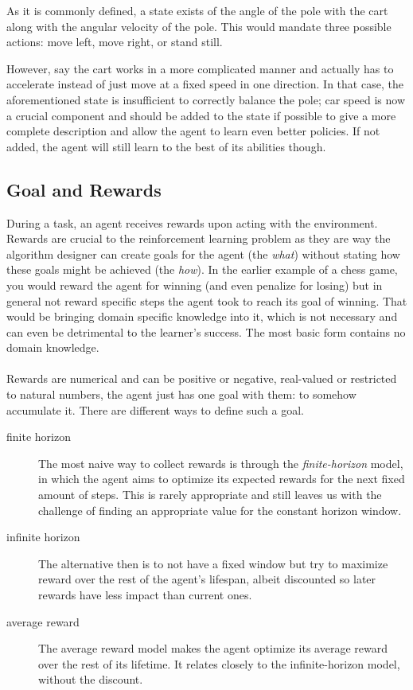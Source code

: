 As it is commonly defined,
a state exists of the angle of the pole with the cart
along with the angular velocity of the pole.
This would mandate three possible actions:
move left, move right, or stand still.

However, say the cart works in a more complicated manner
and actually has to accelerate instead of just
move at a fixed speed in one direction.
In that case,
the aforementioned state is insufficient
to correctly balance the pole;
car speed is now a crucial component
and should be added to the state if possible
to give a more complete description
and allow the agent to learn even better policies.
If not added, the agent will still learn
to the best of its abilities though.


\subsection{Goal and Rewards}
During a task,
an agent receives rewards upon acting with the environment.
Rewards are crucial to the reinforcement learning problem
as they are way the algorithm designer
can create goals for the agent (the \textit{what})
without stating how these goals might be achieved (the \textit{how}).
In the earlier example of a chess game,
you would reward the agent for winning
(and even penalize for losing)
but in general not reward specific steps the agent took
to reach its goal of winning.
That would be bringing domain specific knowledge into it,
which is not necessary and can
even be detrimental to the learner's success.
The most basic form contains no domain knowledge.


\paragraph{}
Rewards are numerical and can be positive or negative,
real-valued or restricted to natural numbers,
the agent just has one goal with them:
to somehow accumulate it.
There are different ways to define such a goal.

\begin{description}
  \item[finite horizon] 
    The most naive way to collect rewards is through the
    \textit{finite-horizon} model,
    in which the agent aims to optimize its expected
    rewards for the next fixed amount of steps.
    This is rarely appropriate and still leaves us
    with the challenge of finding an appropriate value
    for the constant horizon window.
  \item[infinite horizon]
    The alternative then is to not have a fixed window
    but try to maximize reward over the rest of the agent's lifespan,
    albeit discounted so later rewards have less impact than current ones.
  \item[average reward]
    The average reward model makes the agent optimize
    its average reward over the rest of its lifetime.
    It relates closely to the infinite-horizon model, without the discount.
\end{description}

